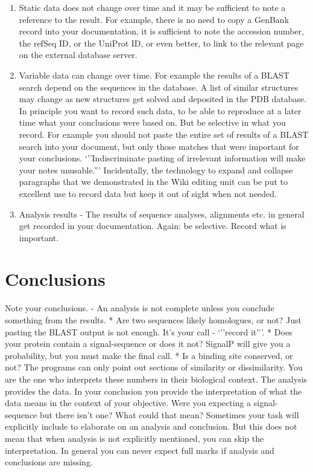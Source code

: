 \documentclass[]{book}
\providecommand{\tightlist}{%
  \setlength{\itemsep}{0pt}\setlength{\parskip}{0pt}}
\begin{document}
\begin{itemize}
  \begin{enumerate}
  \def\labelenumi{\arabic{enumi}.}
  \tightlist
  \item
    Static data does not change over time and it may be sufficient to
    note a reference to the result. For example, there is no need to
    copy a GenBank record into your documentation, it is sufficient to
    note the accession number, the refSeq ID, or the UniProt ID, or even
    better, to link to the relevant page on the external database
    server.
  \item
    Variable data can change over time. For example the results of a
    BLAST search depend on the sequences in the database. A list of
    similar structures may change as new structures get solved and
    deposited in the PDB database. In principle you want to record such
    data, to be able to reproduce at a later time what your conclusions
    were based on. But be selective in what you record. For example you
    should not paste the entire set of results of a BLAST search into
    your document, but only those matches that were important for your
    conclusions. `''Indiscriminate pasting of irrelevant information
    will make your notes unusable.''' Incidentally, the technology to
    expand and collapse paragraphs that we demonstrated in the Wiki
    editing unit can be put to excellent use to record data but keep it
    out of sight when not needed.
  \item
    Analysis results - The results of sequence analyses, alignments etc.
    in general get recorded in your documentation. Again: be selective.
    Record what is important.
  \end{enumerate}
\end{itemize}

\section{Conclusions}\label{conclusions}

Note your conclusions. - An analysis is not complete unless you conclude
something from the results. * Are two sequences likely homologues, or
not? Just pasting the BLAST output is not enough. It's your call -
`''record it'''. * Does your protein contain a signal-sequence or does
it not? SignalP will give you a probability, but you must make the final
call. * Is a binding site conserved, or not? The programs can only point
out sections of similarity or dissimilarity. You are the one who
interprets these numbers in their biological context. The analysis
provides the data. In your conclusion you provide the interpretation of
what the data means in the context of your objective. Were you expecting
a signal-sequence but there isn't one? What could that mean? Sometimes
your task will explicitly include to elaborate on an analysis and
conclusion. But this does not mean that when analysis is not explicitly
mentioned, you can skip the interpretation. In general you can never
expect full marks if analysis and conclusions are missing.
\end{document}
